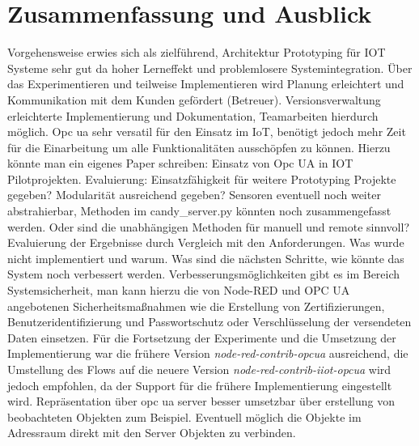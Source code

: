 \documentclass[BMR,Bachelor,ngerman]{twbook}%
\begin{document}
\chapter{Zusammenfassung und Ausblick}
Vorgehensweise erwies sich als zielführend, Architektur Prototyping für IOT Systeme sehr gut da hoher Lerneffekt und problemlosere Systemintegration. Über das Experimentieren und teilweise Implementieren wird Planung erleichtert und Kommunikation mit dem Kunden gefördert (Betreuer).
Versionsverwaltung erleichterte Implementierung und Dokumentation, Teamarbeiten hierdurch möglich.
Opc ua sehr versatil für den Einsatz im IoT, benötigt jedoch mehr Zeit für die Einarbeitung um alle Funktionalitäten ausschöpfen zu können. Hierzu könnte man ein eigenes Paper schreiben: Einsatz von Opc UA in IOT Pilotprojekten.
Evaluierung: Einsatzfähigkeit für weitere Prototyping Projekte gegeben? Modularität ausreichend gegeben? Sensoren eventuell noch weiter abstrahierbar, Methoden im candy\_server.py könnten noch zusammengefasst werden. Oder sind die unabhängigen Methoden für manuell und remote sinnvoll?
Evaluierung der Ergebnisse durch Vergleich mit den Anforderungen. Was wurde nicht implementiert und warum. Was sind die nächsten Schritte, wie könnte das System noch verbessert werden. Verbesserungsmöglichkeiten gibt es im Bereich Systemsicherheit, man kann hierzu die von Node-RED und \ac{OPC UA} angebotenen Sicherheitsmaßnahmen wie die Erstellung von Zertifizierungen, Benutzeridentifizierung und Passwortschutz oder Verschlüsselung der versendeten Daten einsetzen.
 {\color{purple}Für die Fortsetzung der Experimente und die Umsetzung der Implementierung war die frühere Version \emph{node-red-contrib-opcua} ausreichend, die Umstellung des Flows auf die neuere Version \emph{node-red-contrib-iiot-opcua} wird jedoch empfohlen, da der Support für die frühere Implementierung eingestellt wird.} Repräsentation über opc ua server besser umsetzbar über erstellung von beobachteten Objekten zum Beispiel. Eventuell möglich die Objekte im Adressraum direkt mit den Server Objekten zu verbinden. 
%
\end{document}

